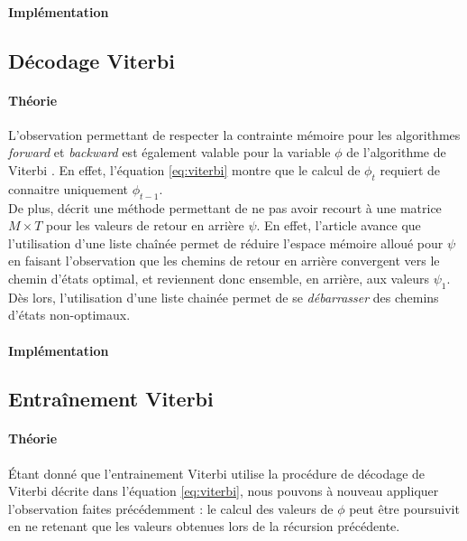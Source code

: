 \documentclass[letterpaper]{article}
\begin{document}
\paragraph{Implémentation}

\subsection{Décodage Viterbi}
\paragraph{Théorie}
L'observation permettant de respecter la contrainte mémoire pour les algorithmes \textit{forward} et \textit{backward} est également valable pour la variable $\phi$ de l'algorithme de Viterbi \citep{Ch}. En effet, l'équation \ref{eq:viterbi} montre que le calcul de $\phi_t$ requiert de connaitre uniquement $\phi_{t-1}$.  \\

De plus, \cite{Ch} décrit une méthode permettant de ne pas avoir recourt à une matrice $M \times T$ pour les valeurs de retour en arrière $\psi$. En effet, l'article avance que l'utilisation d'une liste chaînée permet de réduire l'espace mémoire alloué pour $\psi$ en faisant l'observation que les chemins de retour en arrière convergent vers le chemin d'états optimal, et reviennent donc ensemble, en arrière, aux valeurs $\psi_1$. Dès lors, l'utilisation d'une liste chainée permet de se \textit{débarrasser} des chemins d'états non-optimaux.

\paragraph{Implémentation}

\subsection{Entraînement Viterbi}
\paragraph{Théorie}
Étant donné que l'entrainement Viterbi utilise la procédure de décodage de Viterbi décrite dans l'équation \ref{eq:viterbi}, nous pouvons à nouveau appliquer l'observation faites précédemment : le calcul des valeurs de $\phi$ peut être poursuivit en ne retenant que les valeurs obtenues lors de la récursion précédente.  \\
\end{document}
